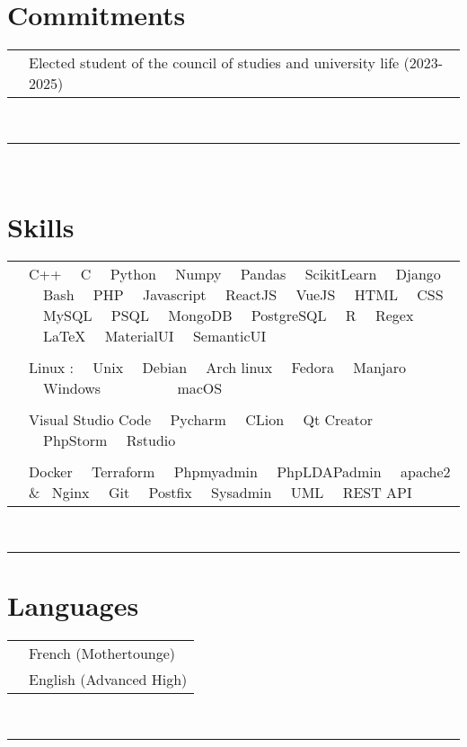 \documentclass[oneside]{article}
\begin{document}
{\begin{minipage}[t][\textheight-2\fboxsep-2\fboxrule][t]{\dimexpr0.35\textwidth-2\fboxrule-2\fboxsep\relax}
        \section*{\large Commitments}
        \begin{tabularx}{\textwidth}{cY}
            &Elected student of the council of 
            studies and university life (2023-2025)\\
        \end{tabularx}

\
        \rule{\linewidth}{0.4pt} \\
        \section*{\large Skills}
        \begin{tabularx}{\textwidth}{cY}
            \faCode{}        & C++ \ \  C \ \  Python \ \  Numpy \ \  Pandas \ \  ScikitLearn \ \  Django \ \  Bash \ \  PHP \ \  Javascript \ \  ReactJS \ \  VueJS \ \  HTML \ \  CSS \ \  MySQL \ \  PSQL \ \  MongoDB \ \  PostgreSQL \ \  R \ \  Regex \ \  LaTeX \ \  MaterialUI \ \  SemanticUI   \\ \\
            \faCogs{}        & Linux : \ \  Unix \ \  Debian \ \  Arch linux \ \  Fedora \ \  Manjaro \ \  Windows \ \ \ \ \ \ \ \ \ \  macOS \\ \\
            \faLaptopCode{}  & Visual Studio Code \ \  Pycharm \ \  CLion \ \  Qt Creator \ \  PhpStorm \ \  Rstudio \\ \\
            \faToolbox{}     & Docker \ \  Terraform \ \  Phpmyadmin  \ \ PhpLDAPadmin \ \  apache2 \& \  Nginx \ \  Git \ \  Postfix \ \  Sysadmin \ \  UML \ \  REST API
        \end{tabularx}
        \vspace{1pt} \\
        \rule{\linewidth}{0.4pt}

        \section*{\large Languages}
        \begin{tabular}{cl}
            \faLanguage{} & French (Mothertounge)\\
            \faLanguage{} & English (Advanced High)\end{tabular}
        \vspace{.1cm}
        \\
        \rule{\linewidth}{0.4pt}

\end{minipage}}
\end{document}
